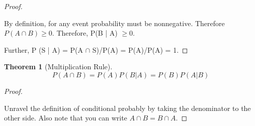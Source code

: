 \documentclass[10pt,]{book}
\theoremstyle{plain}
\newtheorem{theorem}{Theorem}[section]
\theoremstyle{definition}
\theoremstyle{definition}
\numberwithin{equation}{section}
\begin{document}
\begin{proof}\hypertarget{proof-16}{}

		By definition, for any event probability must be nonnegative. Therefore
		\(P(A \cap B) \ge 0\).  Therefore, P(B | A) \(\ge 0\).
\par

		Further, P (S | A) = P(A \(\cap\) S)/P(A) = P(A)/P(A) = 1.
\end{proof}
\begin{theorem}[Multiplication Rule]\label{theorem-22}
\begin{equation*}P(A \cap B) = P(A) P(B | A) = P(B) P(A | B)\end{equation*}\end{theorem}
\begin{proof}\hypertarget{proof-17}{}

		Unravel the definition of conditional probably by taking the denominator to the other side. Also note that you can write \(A \cap B = B \cap A\).
\end{proof}
\typeout{************************************************}
\typeout{************************************************}
\end{document}
